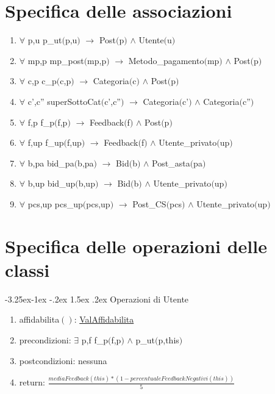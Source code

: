 \documentclass{article}
\makeatletter
\renewcommand\subsection{\@startsection{subsection}{2}{\z@}%
                                     {-3.25ex\@plus-1ex \@minus-.2ex}%
                                     {1.5ex \@plus.2ex}%
                                     {\normalfont\normalsize\bfseries}}
\makeatother
\begin{document}
\newpage
\section{\label{sec:SpecificaAssociazioni}Specifica delle associazioni}
\begin{enumerate}
    \item $\forall$ p,u p\_ut$($p,u$)$ $\rightarrow$ Post$($p$)$ $\land$ Utente$($u$)$
    \item $\forall$ mp,p mp\_post$($mp,p$)$ $\rightarrow$ Metodo\_pagamento$($mp$)$ $\land$ Post$($p$)$
    \item $\forall$ c,p c\_p$($c,p$)$ $\rightarrow$ Categoria$($c$)$ $\land$ Post$($p$)$
    \item $\forall$ c',c'' superSottoCat$($c',c''$)$ $\rightarrow$ Categoria$($c'$)$ $\land$ Categoria$($c''$)$
    \item $\forall$ f,p f\_p$($f,p$)$ $\rightarrow$ Feedback$($f$)$ $\land$ Post$($p$)$
    \item $\forall$ f,up f\_up$($f,up$)$ $\rightarrow$ Feedback$($f$)$ $\land$ Utente\_privato$($up$)$
    \item $\forall$ b,pa bid\_pa$($b,pa$)$ $\rightarrow$ Bid$($b$)$ $\land$ Post\_asta$($pa$)$
    \item $\forall$ b,up bid\_up$($b,up$)$ $\rightarrow$ Bid$($b$)$ $\land$ Utente\_privato$($up$)$
    \item $\forall$ pcs,up pcs\_up$($pcs,up$)$ $\rightarrow$ Post\_CS$($pcs$)$ $\land$ Utente\_privato$($up$)$
\end{enumerate}

\newpage
\section{\label{sec:SpecificaOperazioniClassi}Specifica delle operazioni delle classi}

\subsection{\label{sec:OperazioniUtente}Operazioni di Utente}

\begin{enumerate}
    \item\label{sec:OperazioniUtenteAffidabilita}affidabilita$()$: \hyperref[sec:TipoValAffidabilita]{ValAffidabilita}
    \item precondizioni: $\exists$ p,f f\_p$($f,p$)$ $\land$ p\_ut$($p,this$)$
    \item postcondizioni: nessuna
    \item return: $\frac{mediaFeedback(this) * (1 - percentualeFeedbackNegativi(this))}{5}$
\end{enumerate}
\end{document}
